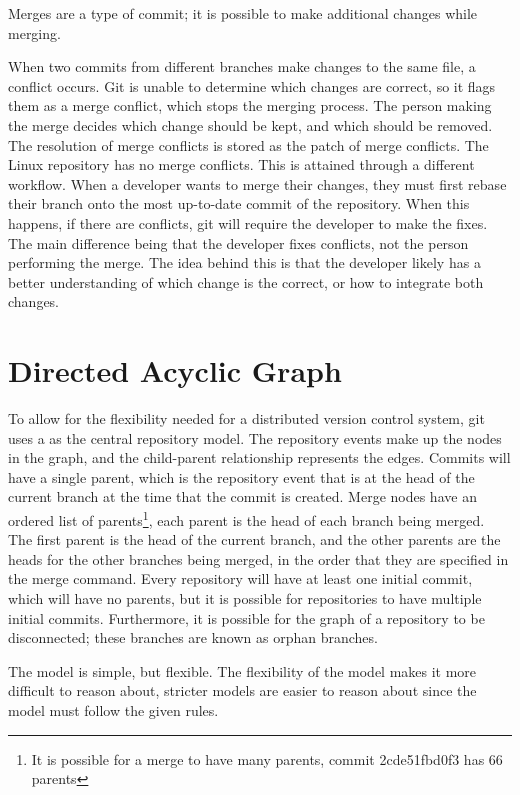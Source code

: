 Merges are a type of commit; it is possible to make additional
changes while merging.

When two commits from different branches make changes to the same file,
a conflict occurs.
Git is unable to determine which changes are correct, so it flags them
as a merge conflict, which stops the merging process.
The person making the merge decides which change should be kept,
and which should be removed.
The resolution of merge conflicts is stored as the patch of merge
conflicts.
The Linux repository has no merge conflicts.
This is attained through a different workflow.
When a developer wants to merge their changes, they must first rebase
their branch onto the most up-to-date commit of the repository.
When this happens, if there are conflicts, git will require
the developer to make the fixes.
The main difference being that the developer fixes conflicts,
not the person performing the merge.
The idea behind this is that the developer likely has a better
understanding of which change is the correct, or how to integrate both
changes.

\section{Directed Acyclic Graph}
\label{sec:directed_acyclic_graph}

To allow for the flexibility needed for a distributed version control
system, git uses a  as the central
repository model.
The repository events make up the nodes in the graph, and the
child-parent relationship represents the edges.
Commits will have a single parent, which is the repository event that
is at the head of the current branch at the time that the commit
is created.
Merge nodes have an ordered list of
parents\footnote{It is possible for a merge to have many parents, commit
  2cde51fbd0f3 has 66 parents},
each parent is the head of each branch being merged.
The first parent is the head of the current branch, and the other
parents are the heads for the other branches being merged, in the order
that they are specified in the merge command.
Every repository will have at least one initial commit, which
will have no parents, but it is possible for repositories to have
multiple initial commits.
Furthermore, it is possible for the graph of a repository to be
disconnected; these branches are known as orphan branches.

The model is simple, but flexible.
The flexibility of the model makes it more difficult to reason about,
stricter models are easier to reason about since the model must follow
the given rules.


